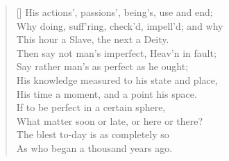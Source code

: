 \begin{verse}[\versewidth]
His actions', passions', being's, use and end;\\
Why doing, suff'ring, check'd, impell'd; and why\\
This hour a Slave, the next a Deity.\\
\vin Then say not man's imperfect, Heav'n in fault;\\
Say rather man's as perfect as he ought;\\
His knowledge measured to his state and place,\\
His time a moment, and a point his space.\\
If to be perfect in a certain sphere,\\
What matter soon or late, or here or there?\\
The blest to-day is as completely so\\
As who began a thousand years ago.


\end{verse}
